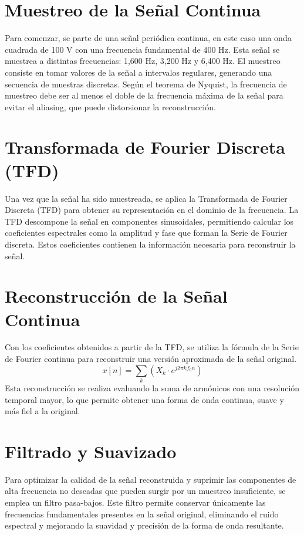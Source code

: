 \documentclass[conference]{IEEEtran}
\theoremstyle{mytheoremstyle}
\theoremstyle{mytheoremstyle}
\theoremstyle{myproblemstyle}
\begin{document}
        \section{Muestreo de la Señal Continua}
        Para comenzar, se parte de una señal periódica continua, en este caso una onda cuadrada de 100 V con una frecuencia fundamental de 400 Hz. Esta señal se muestrea a distintas frecuencias: 1,600 Hz, 3,200 Hz y 6,400 Hz. El muestreo consiste en tomar valores de la señal a intervalos regulares, generando una secuencia de muestras discretas. Según el teorema de Nyquist, la frecuencia de muestreo debe ser al menos el doble de la frecuencia máxima de la señal para evitar el aliasing, que puede distorsionar la reconstrucción.
        
        \section{Transformada de Fourier Discreta (TFD)}
        Una vez que la señal ha sido muestreada, se aplica la Transformada de Fourier Discreta (TFD) para obtener su representación en el dominio de la frecuencia. La TFD descompone la señal en componentes sinusoidales, permitiendo calcular los coeficientes espectrales como la amplitud y fase que forman la Serie de Fourier discreta. Estos coeficientes contienen la información necesaria para reconstruir la señal.
        
        \section{Reconstrucción de la Señal Continua}
        Con los coeficientes obtenidos a partir de la TFD, se utiliza la fórmula de la Serie de Fourier continua para reconstruir una versión aproximada de la señal original.
        \[
        x[n] = \sum_{k} (X_k \cdot e^{j 2 \pi k f_0 n})
        \]
        Esta reconstrucción se realiza evaluando la suma de armónicos con una resolución temporal mayor, lo que permite obtener una forma de onda continua, suave y más fiel a la original.
        
        \section{Filtrado y Suavizado}
        Para optimizar la calidad de la señal reconstruida y suprimir las componentes de alta frecuencia no deseadas que pueden surgir por un muestreo insuficiente, se emplea un filtro pasa-bajos. Este filtro permite conservar únicamente las frecuencias fundamentales presentes en la señal original, eliminando el ruido espectral y mejorando la suavidad y precisión de la forma de onda resultante.
        
\end{document}
